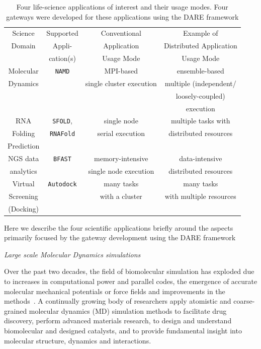 \documentclass{sig-alternate}
\begin{document}
\begin{table}
 \tiny
\begin{tabular}{|c|c|c|c|} 
  \hline Science  & Supported  & Conventional   & Example of  
  \\
  Domain & Appli- & Application & Distributed Application \\ 
  &  cation(s) & Usage Mode & Usage Mode \\  \hline \hline 
  
  Molecular   &  \texttt{NAMD} &  MPI-based  & ensemble-based   \\
   Dynamics  &  & single cluster execution & multiple (independent/ \\ 
   &  &  &  loosely-coupled)  \\ 
   &  &  &  execution \\ \hline
  RNA   & \texttt{SFOLD}, & single node   & multiple tasks with \\
  Folding   & \texttt{RNAFold} & serial execution &   distributed resources \\
  Prediction & &  & \\ \hline
  NGS data     &  \texttt{BFAST} & memory-intensive  & data-intensive\\ 
     analytics  &  &  single node execution   &  distributed resources \\ \hline
  Virtual  & \texttt{Autodock} &  many tasks   & many tasks \\
   Screening  &  & with a cluster  & with multiple resources \\
  (Docking) &  &  & \\ \hline

\hline
\end{tabular} \caption{Four life-science applications of interest and their usage modes.  Four gateways were developed for these applications using the DARE framework}
 \label{table:four-applications} 
\end{table}

Here we describe the four scientific applications briefly around the aspects primarily focused by the gateway development using the DARE framework

\textit{Large scale Molecular Dynamics simulations}

Over the past two decades, the field of biomolecular simulation has
exploded due to increases in computational power and parallel codes,
the emergence of accurate molecular mechanical potentials or force
fields and improvements in the methods~\cite{amber,mackerell2008,adcock2006}. A continually growing body of researchers apply atomistic and coarse-grained molecular dynamics (MD) simulation
methods to facilitate drug discovery, perform advanced materials
research, to design and understand biomolecular and designed
catalysts, and to provide fundamental insight into molecular
structure, dynamics and interactions\cite{meinke2009,mcdowell2006,beck2007,}. 
\end{document}
